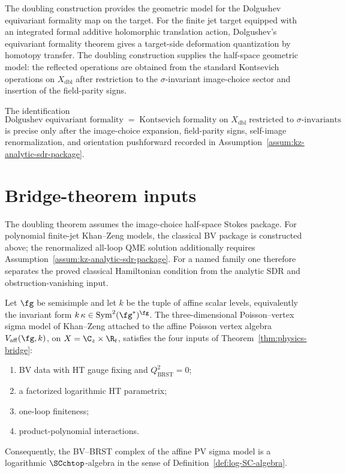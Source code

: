 \begin{remark}
The doubling construction provides the geometric model for the
Dolgushev equivariant formality map on the target. For the finite
jet target equipped with an integrated formal additive holomorphic
translation action, Dolgushev's equivariant formality theorem gives a
target-side deformation quantization by homotopy transfer. The
doubling construction supplies the half-space geometric model: the
reflected operations are obtained from the standard Kontsevich
operations on $X_{\mathrm{dbl}}$ after restriction to the
$\sigma$-invariant image-choice sector and insertion of the
field-parity signs.

The identification
\[
\text{Dolgushev equivariant formality}
\;=\;
\text{Kontsevich formality on }X_{\mathrm{dbl}}
\;\text{restricted to }\sigma\text{-invariants}
\]
is precise only after the image-choice expansion, field-parity signs,
self-image renormalization, and orientation pushforward recorded in
Assumption~\ref{assum:kz-analytic-sdr-package}.
\end{remark}

\section{Bridge-theorem inputs}
\label{sec:bridge-theorem-inputs}

The doubling theorem assumes the image-choice half-space
Stokes package. For polynomial finite-jet Khan--Zeng models, the
classical BV package is constructed above; the renormalized all-loop
QME solution additionally requires
Assumption~\ref{assum:kz-analytic-sdr-package}. For a named family
one therefore separates the proved classical Hamiltonian condition
from the analytic SDR and obstruction-vanishing input.

\begin{proposition}%
\label{prop:affine-is-log-SC}
Let $\fg$ be semisimple and let $k$ be the tuple of affine scalar
levels, equivalently the invariant form
$k\,\kappa\in\mathrm{Sym}^2(\fg^*)^\fg$. The three-dimensional
Poisson--vertex sigma model of Khan--Zeng attached to the affine
Poisson vertex algebra $V_{\mathrm{aff}}(\fg, k)$, on
$X = \C_z \times \R_t$, satisfies the four inputs of
Theorem~\textup{\ref{thm:physics-bridge}}:
\begin{enumerate}[label=\textup{(\alph*)}]
\item BV data with HT gauge fixing and $Q_{\mathrm{BRST}}^2 = 0$;
\item a factorized logarithmic HT parametrix;
\item one-loop finiteness;
\item product-polynomial interactions.
\end{enumerate}
Consequently, the BV--BRST complex of the affine PV sigma model is a
logarithmic $\SCchtop$-algebra in the sense of
Definition~\textup{\ref{def:log-SC-algebra}}.
\end{proposition}

